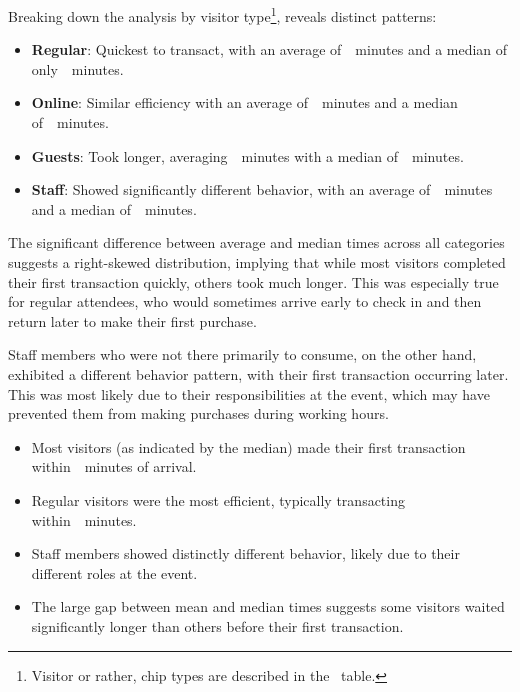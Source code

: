 Breaking down the analysis by visitor type\footnote{Visitor or rather, chip types are described in the~ table.}, reveals distinct patterns:
\begin{itemize}
	\item \textbf{Regular}: Quickest to transact, with an average of~~minutes and a median of only~~minutes.
	\item \textbf{Online}: Similar efficiency with an average of~~minutes and a median of~~minutes.
	\item \textbf{Guests}: Took longer, averaging~~minutes with a median of~~minutes.
	\item \textbf{Staff}: Showed significantly different behavior, with an average of~~minutes and a median of~~minutes.
\end{itemize}

The significant difference between average and median times across all categories suggests a right-skewed distribution, implying that while most visitors completed their first transaction quickly, others took much longer.
This was especially true for regular attendees, who would sometimes arrive early to check in and then return later to make their first purchase.

Staff members who were not there primarily to consume, on the other hand, exhibited a different behavior pattern, with their first transaction occurring later.
This was most likely due to their responsibilities at the event, which may have prevented them from making purchases during working hours.

\begin{keytakeaways}
	\begin{itemize}
		\item Most visitors (as indicated by the median) made their first transaction within~~minutes of arrival.
		\item Regular visitors were the most efficient, typically transacting within~~minutes.
		\item Staff members showed distinctly different behavior, likely due to their different roles at the event.
		\item The large gap between mean and median times suggests some visitors waited significantly longer than others before their first transaction.
	\end{itemize}
\end{keytakeaways}

